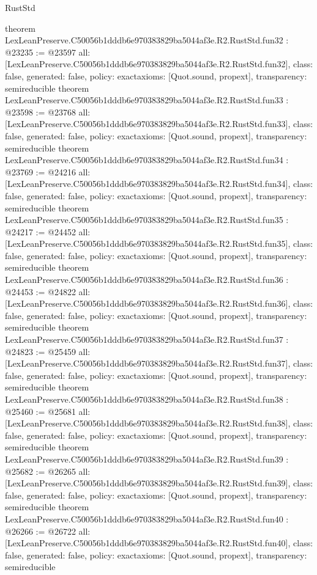 \begin{lexlean}{RustStd}
\begin{coremodule}
{}
theorem LexLeanPreserve.C50056b1dddb6e970383829ba5044af3e.R2.RustStd.fun32 : @23235 := @23597 {
  all: [LexLeanPreserve.C50056b1dddb6e970383829ba5044af3e.R2.RustStd.fun32],
  class: false,
  generated: false,
  policy: exact{axioms: [Quot.sound, propext]},
  transparency: semireducible
}
theorem LexLeanPreserve.C50056b1dddb6e970383829ba5044af3e.R2.RustStd.fun33 : @23598 := @23768 {
  all: [LexLeanPreserve.C50056b1dddb6e970383829ba5044af3e.R2.RustStd.fun33],
  class: false,
  generated: false,
  policy: exact{axioms: [Quot.sound, propext]},
  transparency: semireducible
}
theorem LexLeanPreserve.C50056b1dddb6e970383829ba5044af3e.R2.RustStd.fun34 : @23769 := @24216 {
  all: [LexLeanPreserve.C50056b1dddb6e970383829ba5044af3e.R2.RustStd.fun34],
  class: false,
  generated: false,
  policy: exact{axioms: [Quot.sound, propext]},
  transparency: semireducible
}
theorem LexLeanPreserve.C50056b1dddb6e970383829ba5044af3e.R2.RustStd.fun35 : @24217 := @24452 {
  all: [LexLeanPreserve.C50056b1dddb6e970383829ba5044af3e.R2.RustStd.fun35],
  class: false,
  generated: false,
  policy: exact{axioms: [Quot.sound, propext]},
  transparency: semireducible
}
theorem LexLeanPreserve.C50056b1dddb6e970383829ba5044af3e.R2.RustStd.fun36 : @24453 := @24822 {
  all: [LexLeanPreserve.C50056b1dddb6e970383829ba5044af3e.R2.RustStd.fun36],
  class: false,
  generated: false,
  policy: exact{axioms: [Quot.sound, propext]},
  transparency: semireducible
}
theorem LexLeanPreserve.C50056b1dddb6e970383829ba5044af3e.R2.RustStd.fun37 : @24823 := @25459 {
  all: [LexLeanPreserve.C50056b1dddb6e970383829ba5044af3e.R2.RustStd.fun37],
  class: false,
  generated: false,
  policy: exact{axioms: [Quot.sound, propext]},
  transparency: semireducible
}
theorem LexLeanPreserve.C50056b1dddb6e970383829ba5044af3e.R2.RustStd.fun38 : @25460 := @25681 {
  all: [LexLeanPreserve.C50056b1dddb6e970383829ba5044af3e.R2.RustStd.fun38],
  class: false,
  generated: false,
  policy: exact{axioms: [Quot.sound, propext]},
  transparency: semireducible
}
theorem LexLeanPreserve.C50056b1dddb6e970383829ba5044af3e.R2.RustStd.fun39 : @25682 := @26265 {
  all: [LexLeanPreserve.C50056b1dddb6e970383829ba5044af3e.R2.RustStd.fun39],
  class: false,
  generated: false,
  policy: exact{axioms: [Quot.sound, propext]},
  transparency: semireducible
}
theorem LexLeanPreserve.C50056b1dddb6e970383829ba5044af3e.R2.RustStd.fun40 : @26266 := @26722 {
  all: [LexLeanPreserve.C50056b1dddb6e970383829ba5044af3e.R2.RustStd.fun40],
  class: false,
  generated: false,
  policy: exact{axioms: [Quot.sound, propext]},
  transparency: semireducible
}
\end{coremodule}
\end{lexlean}
